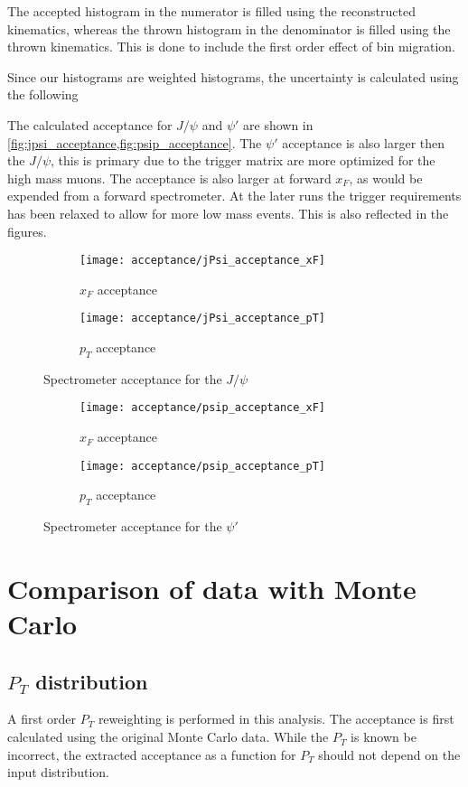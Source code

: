 \documentclass[../main.tex]{subfiles}
\begin{document}
The accepted histogram in the numerator is filled using the reconstructed kinematics, whereas
the thrown histogram in the denominator is filled using the thrown kinematics. This is done to include
the first order effect of bin migration.

Since our histograms are weighted histograms, the uncertainty is calculated using the following

The calculated acceptance for $J/\psi$ and $\psi'$ are shown in \cref{fig:jpsi_acceptance,fig:psip_acceptance}.
The $\psi'$ acceptance is also larger then the $J/\psi$, this is primary due to the 
trigger matrix are more optimized for the high mass muons. The acceptance is also larger at forward $x_F$,
as would be expended from a forward spectrometer.
At the later runs the trigger requirements has been relaxed to allow for more low mass events.
This is also reflected in the figures.  
\begin{figure}[h!]
	\label{fig:jpsi_acceptance}
	\centering
	\begin{subfigure}{0.45\linewidth}
		\texttt{[image: acceptance/jPsi\_acceptance\_xF]}
		\caption{$x_F$ acceptance}
	\end{subfigure}
	\begin{subfigure}{0.45\linewidth}
		\texttt{[image: acceptance/jPsi\_acceptance\_pT]}
		\caption{$p_T$ acceptance}
	\end{subfigure}
	\caption{Spectrometer acceptance for the $J/\psi$}
\end{figure}
\begin{figure}[h!]
	\label{fig:psip_acceptance}
	\centering
	\begin{subfigure}{0.45\linewidth}
		\texttt{[image: acceptance/psip\_acceptance\_xF]}
		\caption{$x_F$ acceptance}
	\end{subfigure}
	\begin{subfigure}{0.45\linewidth}
		\texttt{[image: acceptance/psip\_acceptance\_pT]}
		\caption{$p_T$ acceptance}
	\end{subfigure}
	\caption{Spectrometer acceptance for the $\psi'$}
\end{figure}
\section{Comparison of data with Monte Carlo}

\subsection{\texorpdfstring{$P_T$}{P\_T} distribution}
A first order $P_T$ reweighting is performed in this analysis. The acceptance is first 
calculated using the original Monte Carlo data. While the $P_T$ is known be incorrect,
the extracted acceptance as a function for $P_T$ should not depend on the input
distribution.
\end{document}
